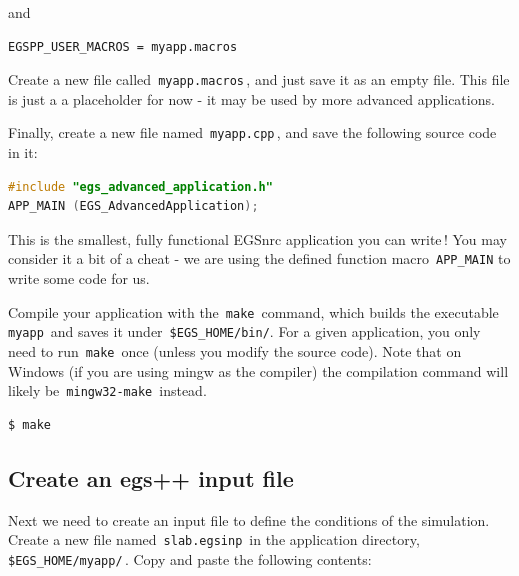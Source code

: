 \documentclass[12pt,twoside]{article}
\begin{document}
and

\begin{lstlisting}
EGSPP_USER_MACROS = myapp.macros
\end{lstlisting}

Create a new file called \,\Verb|myapp.macros|\,, and just save it as an empty
file. This file is just a a placeholder for now - it may be used by
more advanced applications.

Finally, create a new file named \,\Verb|myapp.cpp|\,, and save the following
source code in it:

\begin{lstlisting}[language=c++,backgroundcolor=\color{white}]
#include "egs_advanced_application.h"
APP_MAIN (EGS_AdvancedApplication);
\end{lstlisting}

This is the smallest, fully functional EGSnrc application you can write\,!
You may consider it a bit of a cheat - we are using the defined function macro
\,\Verb|APP_MAIN| to write some code for us.

Compile your application with the \,\Verb|make|\, command, which builds the
executable \,\Verb|myapp|\, and saves it under \,\Verb|$EGS_HOME/bin/|. For a
given application, you only need to run \,\Verb|make|\, once
(unless you modify the source code). Note that on Windows (if you are using
mingw as the compiler) the compilation command will likely be
\,\Verb|mingw32-make|\, instead.
\begin{lstlisting}
$ make
\end{lstlisting}

\subsection{Create an egs++ input file}

Next we need to create an input file to define the conditions of the simulation.
Create a new file named \,\Verb|slab.egsinp|\, in the application directory,
\,\Verb|$EGS_HOME/myapp/|\,. Copy and paste the following contents:
\end{document}
